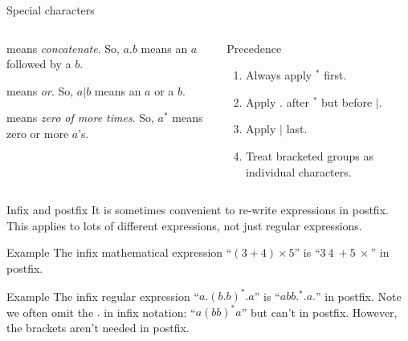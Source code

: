 \begin{frame}{Special characters}
  \begin{columns}
    \begin{column}{0.5\textwidth}
      \begin{description}[abbb]
        \item[$.$] means \emph{concatenate}. So, $a.b$ means an $a$ followed by a $b$.
        \item[$|$] means \emph{or}. So, $a|b$ means an $a$ or a $b$.
        \item[$^*$] means \emph{zero of more times}. So, $a^*$ means zero or more $a$'s.
      \end{description}
    \end{column}
    \begin{column}{0.5\textwidth}
      \begin{alertblock}{Precedence}
        \begin{enumerate}
          \setlength\itemsep{5mm}
          \item Always apply $^*$ first.
          \item Apply $.$ after $^*$ but before $|$.
          \item Apply $|$ last.
          \item Treat bracketed groups as individual characters.
        \end{enumerate}
      \end{alertblock}
    \end{column}
  \end{columns}
\end{frame}

\begin{frame}{Infix and postfix}
  It is sometimes convenient to re-write expressions in postfix.
  This applies to lots of different expressions, not just regular expressions.
  \vspace{2mm}
  \begin{exampleblock}{Example}
    The infix mathematical expression ``$(3+4) \times 5$'' is ``$3 \ 4 \ + 5 \ \times$'' in postfix.
  \end{exampleblock}
  \vspace{2mm}
  \begin{exampleblock}{Example}
    The infix regular expression ``$a.(b.b)^*.a$'' is ``$abb.^*.a.$'' in postfix.
    Note we often omit the $.$ in infix notation: ``$a(bb)^*a$'' but can't in postfix.
    However, the brackets aren't needed in postfix.
  \end{exampleblock}
\end{frame}

